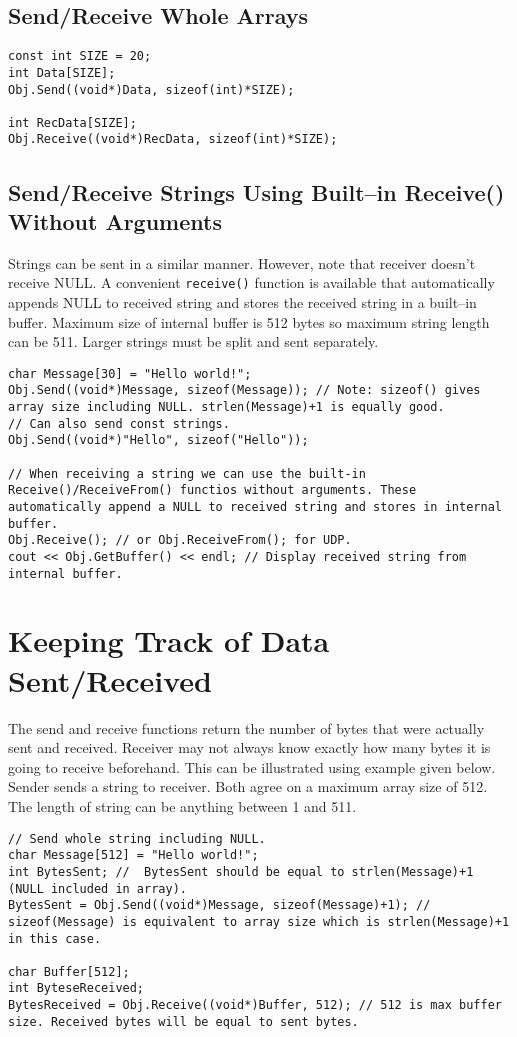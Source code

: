 \documentclass[12pt,a4paper]{article}
\begin{document}
\subsection{Send/Receive Whole Arrays}
\begin{lstlisting}
const int SIZE = 20;
int Data[SIZE];
Obj.Send((void*)Data, sizeof(int)*SIZE);

int RecData[SIZE];
Obj.Receive((void*)RecData, sizeof(int)*SIZE);
\end{lstlisting}
\subsection{Send/Receive Strings Using Built--in Receive() Without Arguments}
Strings can be sent in a similar manner. However, note that receiver doesn't receive NULL. A convenient \verb|receive()| function is available that automatically appends NULL to received string and stores the received string in a built--in buffer. Maximum size of internal buffer is 512 bytes so maximum string length can be 511. Larger strings must be split and sent separately.
\begin{lstlisting}
char Message[30] = "Hello world!";
Obj.Send((void*)Message, sizeof(Message)); // Note: sizeof() gives array size including NULL. strlen(Message)+1 is equally good.
// Can also send const strings.
Obj.Send((void*)"Hello", sizeof("Hello"));

// When receiving a string we can use the built-in Receive()/ReceiveFrom() functios without arguments. These automatically append a NULL to received string and stores in internal buffer.
Obj.Receive(); // or Obj.ReceiveFrom(); for UDP.
cout << Obj.GetBuffer() << endl; // Display received string from internal buffer.
\end{lstlisting}
\section{Keeping Track of Data Sent/Received}
The send and receive functions return the number of bytes that were actually sent and received. Receiver may not always know exactly how many bytes it is going to receive beforehand. This can be illustrated using example given below. Sender sends a string to receiver. Both agree on a maximum array size of 512. The length of string can be anything between 1 and 511.
\begin{lstlisting}
// Send whole string including NULL.
char Message[512] = "Hello world!";
int BytesSent; //  BytesSent should be equal to strlen(Message)+1 (NULL included in array).
BytesSent = Obj.Send((void*)Message, sizeof(Message)+1); // sizeof(Message) is equivalent to array size which is strlen(Message)+1 in this case.

char Buffer[512];
int ByteseReceived;
BytesReceived = Obj.Receive((void*)Buffer, 512); // 512 is max buffer size. Received bytes will be equal to sent bytes.
\end{lstlisting}
\end{document}
